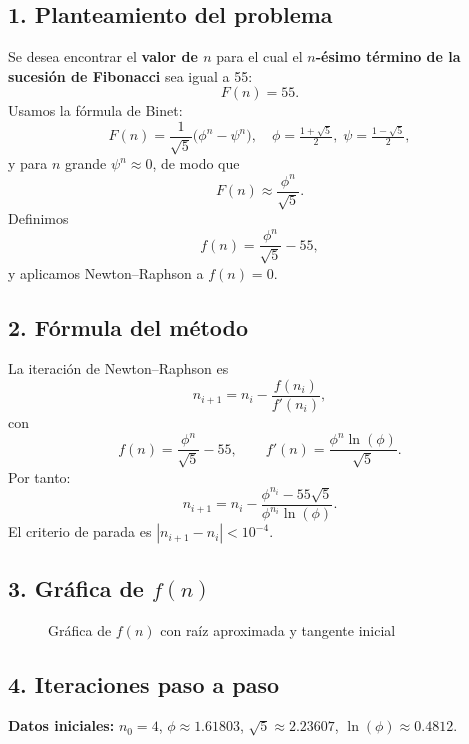 \documentclass[12pt]{article}
\begin{document}
\subsection*{1. Planteamiento del problema}
Se desea encontrar el \textbf{valor de $n$} para el cual el \textbf{$n$-ésimo término de la sucesión de Fibonacci} sea igual a 55:
\[
F(n) = 55.
\]
Usamos la fórmula de Binet:
\[
F(n) = \frac{1}{\sqrt{5}}\bigl(\phi^n - \psi^n\bigr),
\quad
\phi = \tfrac{1+\sqrt{5}}{2},\;\psi = \tfrac{1-\sqrt{5}}{2},
\]
y para $n$ grande $\psi^n\approx0$, de modo que
\[
F(n)\approx\frac{\phi^n}{\sqrt{5}}.
\]
Definimos
\[
f(n)=\frac{\phi^n}{\sqrt{5}} - 55,
\]
y aplicamos Newton–Raphson a $f(n)=0$.

\subsection*{2. Fórmula del método}
La iteración de Newton–Raphson es
\[
n_{i+1}
= n_i
- \frac{f(n_i)}{f'(n_i)},
\]
con
\[
f(n)=\frac{\phi^n}{\sqrt{5}}-55,\qquad
f'(n)=\frac{\phi^n\ln(\phi)}{\sqrt{5}}.
\]
Por tanto:
\[
n_{i+1}
= n_i
- \frac{\phi^{n_i}-55\sqrt5}{\phi^{n_i}\ln(\phi)}.
\]
El criterio de parada es $|n_{i+1}-n_i|<10^{-4}$.

\subsection*{3. Gráfica de $f(n)$}
\begin{figure}[H]
\centering
{}
\caption{Gráfica de $f(n)$ con raíz aproximada y tangente inicial}
\end{figure}

\subsection*{4. Iteraciones paso a paso}
\textbf{Datos iniciales:} $n_0=4$, 
\(\phi\approx1.61803\), 
\(\sqrt{5}\approx2.23607\), 
\(\ln(\phi)\approx0.4812\).
\end{document}
